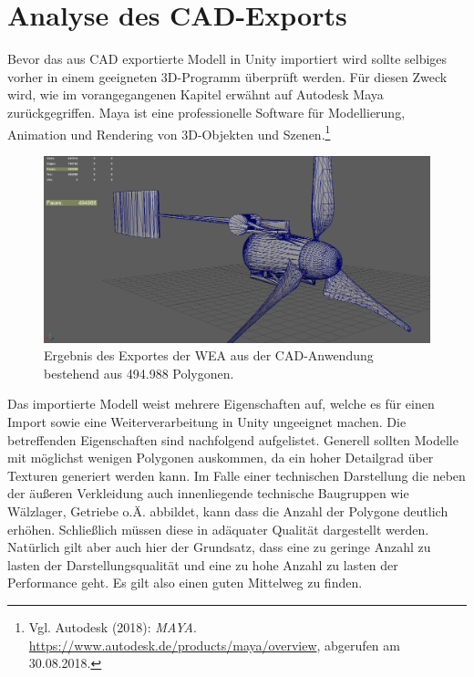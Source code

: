 \section{Analyse des CAD-Exports}
\label{sec:AnalyseDesCAD-Exports}
Bevor das aus CAD exportierte Modell in Unity importiert wird sollte selbiges vorher in einem geeigneten 3D-Programm überprüft werden. Für diesen Zweck wird, wie im vorangegangenen Kapitel erwähnt auf Autodesk Maya zurückgegriffen. Maya ist eine professionelle Software für Modellierung, Animation und Rendering von 3D-Objekten und Szenen.\footnote{Vgl. Autodesk  (2018): \textit{MAYA}.\newline
\url{https://www.autodesk.de/products/maya/overview},\newline 
abgerufen am 30.08.2018.}

\begin{figure}[H]
	\centering
	\captionsetup{width=1\textwidth}
	\includegraphics[keepaspectratio, width=1\textwidth]{bildquellen/WEA-Vergleich1}
	\caption{Ergebnis des Exportes der WEA aus der CAD-Anwendung bestehend aus 494.988 Polygonen.}
	\label{fig:2.2}
\end{figure}

Das importierte Modell  weist mehrere Eigenschaften auf, welche es für einen Import sowie eine Weiterverarbeitung in Unity ungeeignet machen. Die betreffenden Eigenschaften sind nachfolgend aufgelistet. 
Generell sollten Modelle mit möglichst wenigen Polygonen auskommen, da ein hoher Detailgrad über Texturen generiert werden kann. Im Falle einer technischen Darstellung die neben der äußeren Verkleidung auch innenliegende technische Baugruppen wie Wälzlager, Getriebe o.Ä. abbildet, kann dass die Anzahl der Polygone deutlich erhöhen. Schließlich müssen diese in adäquater Qualität dargestellt werden. Natürlich gilt aber auch hier der Grundsatz, dass eine zu geringe Anzahl zu lasten der Darstellungsqualität und eine zu hohe Anzahl zu lasten der Performance geht. Es gilt also einen guten Mittelweg zu finden. 


